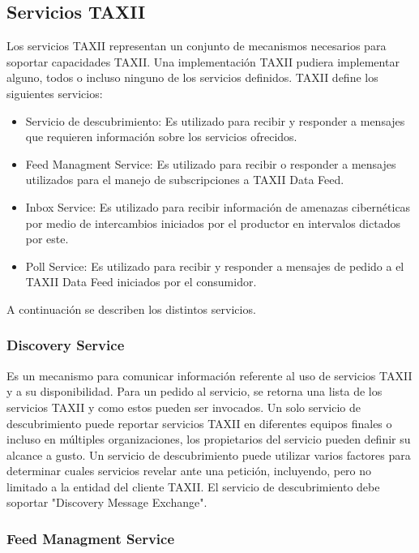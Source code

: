 \subsection{Servicios TAXII}
Los servicios TAXII representan un conjunto de mecanismos necesarios para 
soportar capacidades TAXII. Una implementación TAXII pudiera implementar alguno, 
todos o incluso ninguno de los servicios definidos.
TAXII define los siguientes servicios:
\begin{itemize}
  \item Servicio de descubrimiento: Es utilizado para recibir y responder a 
  mensajes que requieren información sobre los servicios ofrecidos.
  \item Feed Managment Service: Es utilizado para recibir o responder a mensajes 
  utilizados para el manejo de subscripciones a TAXII Data Feed.
  \item Inbox Service: Es utilizado para recibir información de amenazas 
  cibernéticas por medio de intercambios iniciados por el productor en intervalos 
  dictados por este.
  \item Poll Service: Es utilizado para recibir y responder a mensajes de pedido 
  a el TAXII Data Feed iniciados por el consumidor.
\end{itemize}

A continuación se describen los distintos servicios.

\subsubsection{Discovery Service}

Es un mecanismo para comunicar información referente al uso de servicios TAXII y 
a su disponibilidad. Para un pedido al servicio, se retorna una lista de los 
servicios TAXII y como estos pueden ser invocados. Un solo servicio de 
descubrimiento puede reportar servicios TAXII en diferentes equipos finales o 
incluso en múltiples organizaciones, los propietarios del servicio pueden 
definir su alcance a gusto. Un servicio de descubrimiento puede utilizar 
varios factores para determinar cuales servicios revelar ante una petición, 
incluyendo, pero no limitado a la entidad del cliente TAXII.
El servicio de descubrimiento debe soportar "Discovery Message Exchange".

\subsubsection{Feed Managment Service}

